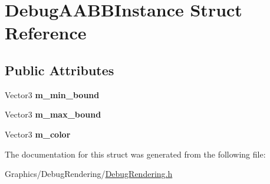 \hypertarget{structDebugAABBInstance}{}\section{Debug\+A\+A\+B\+B\+Instance Struct Reference}
\label{structDebugAABBInstance}
\subsection*{Public Attributes}
\begin{DoxyCompactItemize}
\item 
\mbox{\label{structDebugAABBInstance_a70c7226d27e3102495319048155b0e82}} 
Vector3 {\bfseries m\+\_\+min\+\_\+bound}
\item 
\mbox{\label{structDebugAABBInstance_a047247555ac7f24886e8beb075959ec3}} 
Vector3 {\bfseries m\+\_\+max\+\_\+bound}
\item 
\mbox{\label{structDebugAABBInstance_abf825faaf4d681142ed7ce2e86fb7d7e}} 
Vector3 {\bfseries m\+\_\+color}
\end{DoxyCompactItemize}


The documentation for this struct was generated from the following file\+:\begin{DoxyCompactItemize}
\item 
Graphics/\+Debug\+Rendering/\hyperlink{DebugRendering_8h}{Debug\+Rendering.\+h}\end{DoxyCompactItemize}
